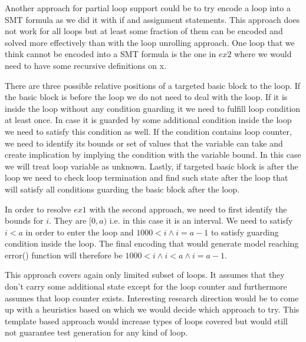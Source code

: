 \documentclass[letterpaper,12pt]{article}
\begin{document}
Another approach for partial loop support could be to try encode a loop into a SMT formula as we did it with if and assignment statements. This approach does not work for all loops but at least some fraction of them can be encoded and solved more effectively than with the loop unrolling approach. One loop that we think cannot be encoded into a SMT formula is the one in $ex2$ where we would need to have some recursive definitions on x.

There are three possible relative positions of a targeted basic block to the loop. If the basic block is before the loop we do not need to deal with the loop. If it is inside the loop without any condition guarding it we need to fulfill loop condition at least once. In case it is guarded by some additional condition inside the loop we need to satisfy this condition as well. If the condition contains loop counter, we need to identify its bounds or set of values that the variable can take and create implication by implying the condition with the variable bound. In this case we will treat loop variable as unknown. Lastly, if targeted basic block is after the loop we need to check loop termination and find such state after the loop that will satisfy all conditions guarding the basic block after the loop. 

In order to resolve $ex1$ with the second approach, we need to first identify the bounds for $i$. They are $[0,a)$ i.e. in this case it is an interval. We need to satisfy $i < a$ in order to enter the loop and $1000 < i \land i = a-1$ to satisfy guarding condition inside the loop. The final encoding that would generate model reaching error() function will therefore be $1000 < i \land i < a \land i = a-1$.

This approach covers again only limited subset of loops. It assumes that they don't carry some additional state except for the loop counter and furthermore assumes that loop counter exists. Interesting research direction would be to come up with a heuristics based on which we would decide which approach to try. This template based approach would increase types of loops covered but would still not guarantee test generation for any kind of loop.
\end{document}
